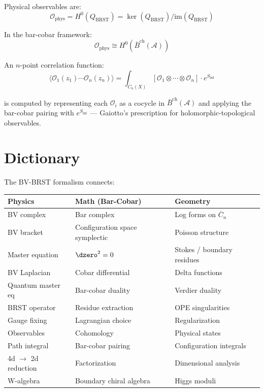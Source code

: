 \begin{theorem}[Observables = cohomology; \ClaimStatusProvedElsewhere{} \cite{CG17}]
\label{thm:observables-brst-cohomology}
Physical observables are:
\[\mathcal{O}_{\text{phys}} = H^0(Q_{\text{BRST}}) = 
\ker(Q_{\text{BRST}})/\text{im}(Q_{\text{BRST}})\]

In the bar-cobar framework:
\[\mathcal{O}_{\text{phys}} \cong H^0(\bar{B}^{\text{ch}}(\mathcal{A}))\]
\end{theorem}

\begin{example}
An $n$-point correlation function:
\[\langle \mathcal{O}_1(z_1) \cdots \mathcal{O}_n(z_n) \rangle = 
\int_{\overline{C}_n(X)} [\mathcal{O}_1 \otimes \cdots \otimes \mathcal{O}_n] 
\cdot e^{S_{\text{int}}}\]

is computed by representing each $\mathcal{O}_i$ as a cocycle in $\bar{B}^{\text{ch}}(\mathcal{A})$ and applying the bar-cobar pairing with $e^{S_{\text{int}}}$ --- Gaiotto's prescription for holomorphic-topological observables.
\end{example}

\section{Dictionary}

\begin{remark}[Dictionary]
The BV-BRST formalism connects:

\begin{center}
\begin{tabular}{|l|l|l|}
\hline
\textbf{Physics} & \textbf{Math (Bar-Cobar)} & \textbf{Geometry} \\
\hline
BV complex & Bar complex & Log forms on $\overline{C}_n$ \\
BV bracket & Configuration space symplectic & Poisson structure \\
Master equation & $\dzero^2 = 0$ & Stokes / boundary residues \\
BV Laplacian & Cobar differential & Delta functions \\
Quantum master eq & Bar-cobar duality & Verdier duality \\
BRST operator & Residue extraction & OPE singularities \\
Gauge fixing & Lagrangian choice & Regularization \\
Observables & Cohomology & Physical states \\
Path integral & Bar-cobar pairing & Configuration integrals \\
4d $\to$ 2d reduction & Factorization & Dimensional analysis \\
W-algebra & Boundary chiral algebra & Higgs moduli \\
\hline
\end{tabular}
\end{center}
\end{remark}

